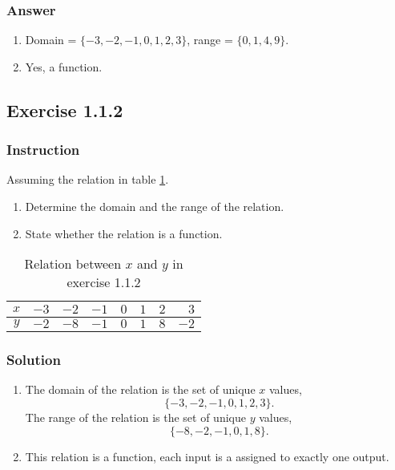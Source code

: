 \documentclass[11pt, letterpaper, oneside]{memoir}
\begin{document}
\subsubsection{Answer}

\begin{enumerate}[label=(\alph*)]
  \item Domain = $ \{ -3, -2, -1, 0, 1, 2, 3 \} $, range = $ \{ 0, 1, 4, 9 \} $.
  \item Yes, a function.
\end{enumerate}

\subsection*{Exercise 1.1.2}

\subsubsection{Instruction}

Assuming the relation in table \ref{table:exercise-1.1.2}.
\begin{enumerate}[label=(\alph*)]
  \item Determine the domain and the range of the relation.
  \item State whether the relation is a function.
\end{enumerate}

\begin{table}[ht]
  \centering
  \begin{tabular}{ c | r r r r r r r }
    \hline
    $ x $ & $ -3 $ & $ -2 $ & $ -1 $ & $ 0 $ & $ 1 $ & $ 2 $ & $ 3 $ \\
    \hline
    $ y $ & $ -2 $ & $ -8 $ & $ -1 $ & $ 0 $ & $ 1 $ & $ 8 $ & $ -2 $ \\
    \hline
  \end{tabular}
  \caption{Relation between $ x $ and $ y $ in exercise 1.1.2}
  \label{table:exercise-1.1.2}
\end{table}

\subsubsection{Solution}

\begin{enumerate}[label=(\alph*)]
  \item The domain of the relation is the set of unique $ x $ values,
    $$ \phantom{.}
    \{ -3, -2, -1, 0, 1, 2, 3 \}
    .$$
    The range of the relation is the set of unique $ y $ values,
    $$ \phantom{.}
    \{ -8, -2, -1, 0, 1, 8\}
    .$$
  \item This relation is a function, each input is a assigned to exactly one output.
\end{enumerate}
\end{document}
